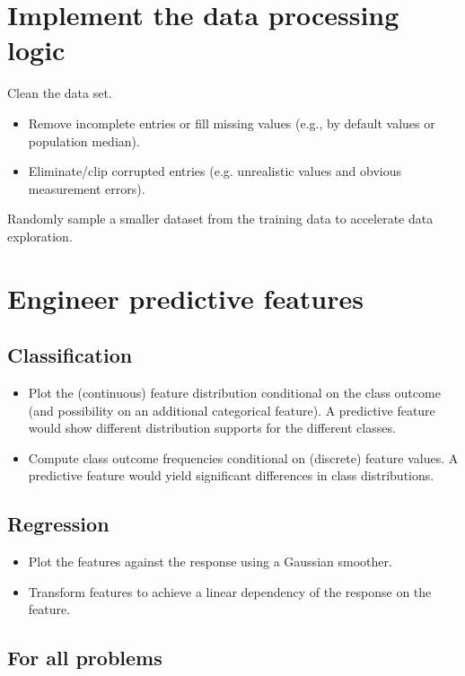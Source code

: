 \documentclass[]{article}
\begin{document}
\section{Implement the data processing logic}

Clean the data set.
\begin{itemize}
\item Remove incomplete entries or fill missing values (e.g., by default values or population median).
\item Eliminate/clip corrupted entries (e.g. unrealistic values and obvious measurement errors).
\end{itemize}

\noindent Randomly sample a smaller dataset from the training data to accelerate data exploration.
\section{Engineer predictive features}

\subsection{Classification}

\begin{itemize}
	\item Plot the (continuous) feature distribution conditional on the class outcome (and possibility on an additional categorical feature). A predictive feature would show different distribution supports for the different classes.
	\item Compute class outcome frequencies conditional on (discrete) feature values. A predictive feature would yield significant differences in class distributions.
\end{itemize}

\subsection{Regression}

\begin{itemize}
	\item Plot the features against the response using a Gaussian smoother.
	\item Transform features to achieve a linear dependency of the response on the feature.	
\end{itemize}

\subsection{For all problems}
\end{document}
